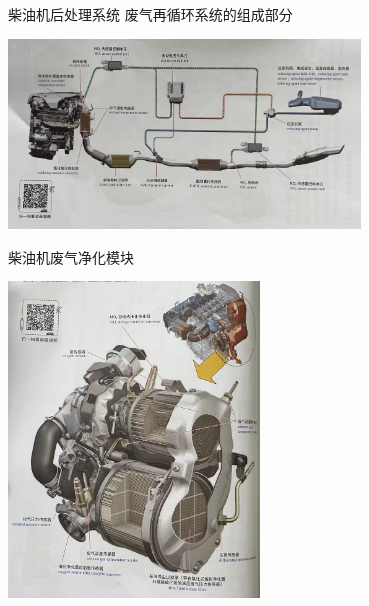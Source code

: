 \begin{frame}
	\begin{block}{柴油机后处理系统}
		废气再循环系统的组成部分
		\begin{center}
			\includegraphics[width=0.7\textwidth]{2-36}
		\end{center}
	\end{block}
\end{frame}
\begin{frame}
	\begin{block}{柴油机废气净化模块}
		\begin{center}
			\includegraphics[width=0.5\textwidth]{2-40}
		\end{center}
	\end{block}
\end{frame}
